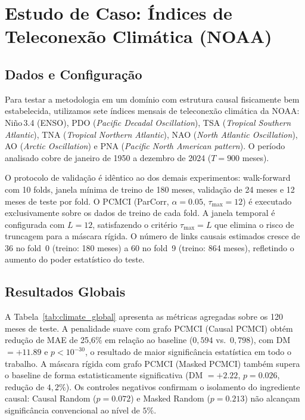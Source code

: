 \documentclass[12pt, a4paper]{article}
\begin{document}
\section{Estudo de Caso: Índices de Teleconexão Climática (NOAA)}

\subsection{Dados e Configuração}

Para testar a metodologia em um domínio com estrutura causal fisicamente bem estabelecida, utilizamos sete índices mensais de teleconexão climática da NOAA: Niño\,3.4 (ENSO), PDO (\emph{Pacific Decadal Oscillation}), TSA (\emph{Tropical Southern Atlantic}), TNA (\emph{Tropical Northern Atlantic}), NAO (\emph{North Atlantic Oscillation}), AO (\emph{Arctic Oscillation}) e PNA (\emph{Pacific North American pattern}). O período analisado cobre de janeiro de 1950 a dezembro de 2024 ($T = 900$ meses).

O protocolo de validação é idêntico ao dos demais experimentos: walk-forward com 10 folds, janela mínima de treino de 180 meses, validação de 24 meses e 12 meses de teste por fold. O PCMCI (ParCorr, $\alpha = 0.05$, $\tau_{\max} = 12$) é executado exclusivamente sobre os dados de treino de cada fold. A janela temporal é configurada com $L = 12$, satisfazendo o critério $\tau_{\max} = L$ que elimina o risco de truncagem para a máscara rígida. O número de links causais estimados cresce de 36 no fold~0 (treino: 180 meses) a 60 no fold~9 (treino: 864 meses), refletindo o aumento do poder estatístico do teste.

\subsection{Resultados Globais}

A Tabela~\ref{tab:climate_global} apresenta as métricas agregadas sobre os 120 meses de teste. A penalidade suave com grafo PCMCI (Causal PCMCI) obtém redução de MAE de 25{,}6\% em relação ao baseline ($0{,}594$ vs.\ $0{,}798$), com DM $= +11.89$ e $p < 10^{-30}$, o resultado de maior significância estatística em todo o trabalho. A máscara rígida com grafo PCMCI (Masked PCMCI) também supera o baseline de forma estatisticamente significativa (DM $= +2.22$, $p = 0.026$, redução de $4{,}2\%$). Os controles negativos confirmam o isolamento do ingrediente causal: Causal Random ($p = 0.072$) e Masked Random ($p = 0.213$) não alcançam significância convencional ao nível de $5\%$.
\end{document}
